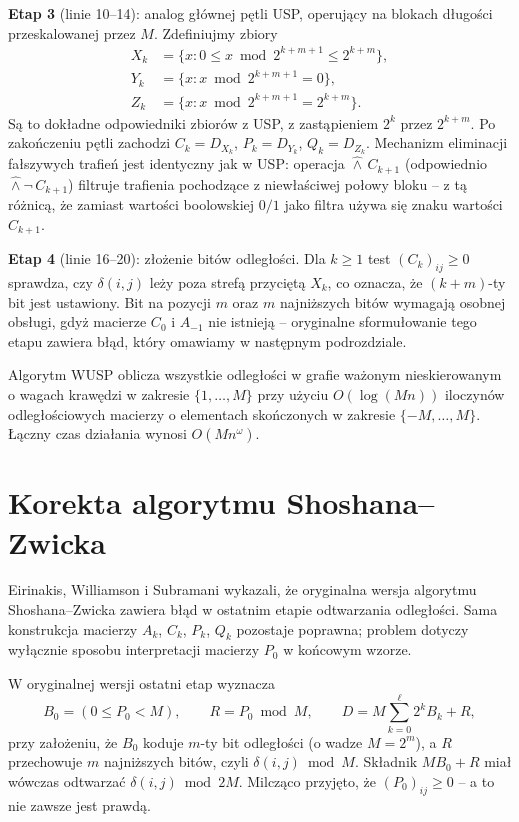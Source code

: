 \textbf{Etap 3} (linie 10--14): analog głównej pętli USP, operujący na blokach długości przeskalowanej przez $M$. Zdefiniujmy zbiory
\[
\begin{aligned}
X_k &= \{x : 0 \leq x \bmod 2^{k+m+1} \leq 2^{k+m}\}, \\
Y_k &= \{x : x \bmod 2^{k+m+1} = 0\}, \\
Z_k &= \{x : x \bmod 2^{k+m+1} = 2^{k+m}\}.
\end{aligned}
\]
Są to dokładne odpowiedniki zbiorów z USP, z zastąpieniem $2^k$ przez $2^{k+m}$. Po zakończeniu pętli zachodzi $C_k = D_{X_k}$, $P_k = D_{Y_k}$, $Q_k = D_{Z_k}$. Mechanizm eliminacji fałszywych trafień jest identyczny jak w USP: operacja $\hat{\wedge}\, C_{k+1}$ (odpowiednio \ $\hat{\wedge}\neg\, C_{k+1}$) filtruje trafienia pochodzące z niewłaściwej połowy bloku -- z tą różnicą, że zamiast wartości boolowskiej $0/1$ jako filtra używa się znaku wartości $C_{k+1}$.

\textbf{Etap 4} (linie 16--20): złożenie bitów odległości. Dla $k \geq 1$ test $(C_k)_{ij} \geq 0$ sprawdza, czy $\delta(i,j)$ leży poza strefą przyciętą $X_k$, co oznacza, że $(k+m)$-ty bit jest ustawiony. Bit na pozycji $m$ oraz $m$ najniższych bitów wymagają osobnej obsługi, gdyż macierze $C_0$ i $A_{-1}$ nie istnieją -- oryginalne sformułowanie tego etapu zawiera błąd, który omawiamy w następnym podrozdziale.

\begin{twierdzenie}
Algorytm WUSP oblicza wszystkie odległości w grafie ważonym nieskierowanym o wagach krawędzi w zakresie $\{1, \ldots, M\}$ przy użyciu $O(\log(Mn))$ iloczynów odległościowych macierzy o elementach skończonych w zakresie $\{-M, \ldots, M\}$. Łączny czas działania wynosi $O(Mn^\omega)$.
\end{twierdzenie}


\section{Korekta algorytmu Shoshana--Zwicka}

Eirinakis, Williamson i Subramani \cite{Eirinakis2017} wykazali, że oryginalna wersja algorytmu Shoshana--Zwicka zawiera błąd w ostatnim etapie odtwarzania odległości. Sama konstrukcja macierzy $A_k$, $C_k$, $P_k$, $Q_k$ pozostaje poprawna; problem dotyczy wyłącznie sposobu interpretacji macierzy $P_0$ w końcowym wzorze.

W oryginalnej wersji ostatni etap wyznacza
\[
B_0 = (0 \leq P_0 < M), \qquad R = P_0 \bmod M, \qquad D = M \sum_{k=0}^{\ell} 2^k B_k + R,
\]
przy założeniu, że $B_0$ koduje $m$-ty bit odległości (o wadze $M = 2^m$), a $R$ przechowuje $m$ najniższych bitów, czyli $\delta(i,j) \bmod M$. Składnik $M B_0 + R$ miał wówczas odtwarzać $\delta(i,j) \bmod 2M$. Milcząco przyjęto, że $(P_0)_{ij} \geq 0$ -- a to nie zawsze jest prawdą.

